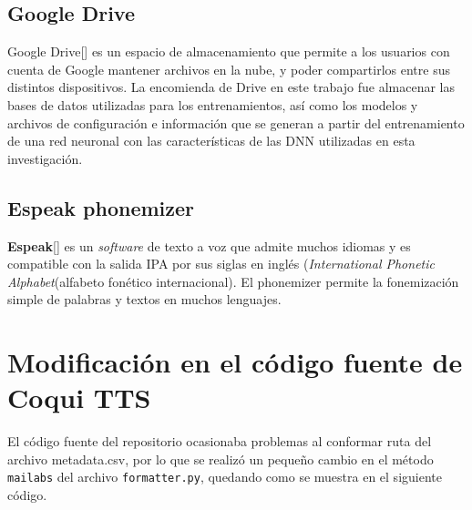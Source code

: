 \subsection{Google Drive}
Google Drive[\cite{drive}] es un espacio de almacenamiento que permite a los usuarios con cuenta de Google mantener archivos en la nube, y poder compartirlos entre sus distintos dispositivos. La encomienda de Drive en este trabajo fue almacenar las bases de datos utilizadas para los entrenamientos, así como los modelos y archivos de configuración e información que se generan a partir del entrenamiento de una red neuronal con las características de las DNN utilizadas en esta investigación.

\subsection{Espeak phonemizer}
\textbf{Espeak}[\cite{espeak}] es un \textit{software} de texto a voz que admite muchos idiomas y  es compatible con la salida IPA por sus siglas en inglés (\textit{International Phonetic Alphabet}(alfabeto fonético internacional).
El phonemizer permite la fonemización simple de palabras y textos en muchos lenguajes.

\section{Modificación en el código fuente de Coqui TTS}
El código fuente del repositorio ocasionaba problemas al conformar ruta del archivo metadata.csv, por lo que se realizó un pequeño cambio en el método \texttt{mailabs} del archivo \texttt{formatter.py}, quedando como se muestra en el siguiente código.



